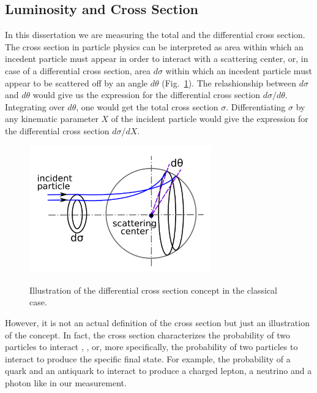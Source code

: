 \subsection{Luminosity and Cross Section}

In this dissertation we are measuring the total and the differential cross section. The cross section in particle physics can be interpreted as area within which an incedent particle must appear in order to interact with a scattering center, or, in case of a differential cross section, area $d\sigma$ within which an incedent particle must appear to be scattered off by an angle $d\theta$ (Fig.~\ref{fig:CSclassical}). The relashionship between $d\sigma$ and $d\theta$ would give us the expression for the differential cross section $d\sigma/d\theta$. Integrating over $d\theta$, one would get the total cross section $\sigma$. Differentiating $\sigma$ by any kinematic parameter $X$ of the incident particle would give the expression for the differential cross section $d\sigma/dX$.\\

\begin{figure}[htb]
  \begin{center}
    {\includegraphics[width=0.70\textwidth]{../figs/WgAbout/CSclassical.png}}
    \caption{Illustration of the differential cross section concept in the classical case.}
    \label{fig:CSclassical}
  \end{center}
\end{figure}


However, it is not an actual definition of the cross section but just an illustration of the concept. In fact, the cross section characterizes the probability of two particles to interact \cite{ref_Griffiths}, \cite{ref_Halzen_Martin}, \cite{ref_CS_wiki} or, more specifically, the probability of two particles to interact to produce the specific final state. For example, the probability of a quark and an antiquark to interact to produce a charged lepton, a neutrino and a photon like in our measurement.\\

